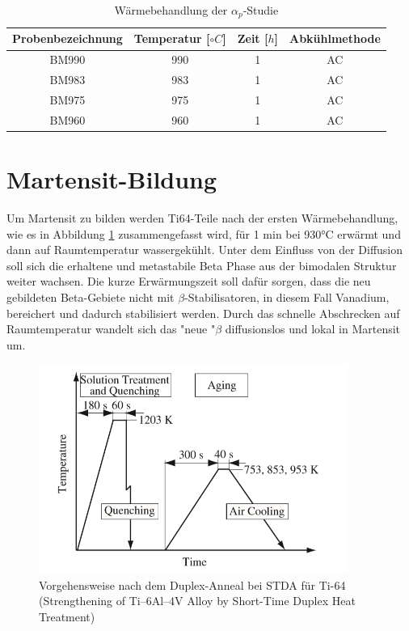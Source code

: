 \begin{table}
		\centering
	\begin{tabular}{|c|c|c|c|}
	\hline 
	Probenbezeichnung & Temperatur [$\circ C$] & Zeit [$h$] & Abkühlmethode \\ 
	\hline 
	BM990 & 990 & 1 & AC\\ 
	\hline 
	BM983 & 983 & 1 & AC\\ 
	\hline 
	BM975 & 975 & 1 & AC\\ 
	\hline 
	BM960 & 960 & 1 & AC\\ 
	\hline 
	\end{tabular} 
	\caption{Wärmebehandlung der $\alpha_p$-Studie}
	\label{tab:alphap}
\end{table}




\section{Martensit-Bildung}

Um Martensit zu bilden werden Ti64-Teile  nach der ersten Wärmebehandlung, wie es in Abbildung \ref{STDA} zusammengefasst wird, für 1 min  bei 930°C erwärmt und dann  auf Raumtemperatur wassergekühlt. Unter dem Einfluss von der Diffusion soll sich die erhaltene und metastabile Beta Phase aus der bimodalen Struktur weiter wachsen. Die kurze Erwärmungszeit soll dafür sorgen, dass die neu gebildeten Beta-Gebiete nicht mit $\beta$-Stabilisatoren, in diesem Fall Vanadium, bereichert  und dadurch stabilisiert werden. Durch das schnelle Abschrecken auf Raumtemperatur wandelt sich das "neue "$\beta$ diffusionslos und lokal in Martensit um. 

\begin{figure}[H]
	\centering
	\includegraphics[width=0.9\textwidth]{Bilder/ts-stda}
	\caption{Vorgehensweise nach dem Duplex-Anneal bei STDA für Ti-64 (Strengthening of Ti–6Al–4V Alloy by Short-Time Duplex Heat Treatment)}
	\label{STDA}
\end{figure}

